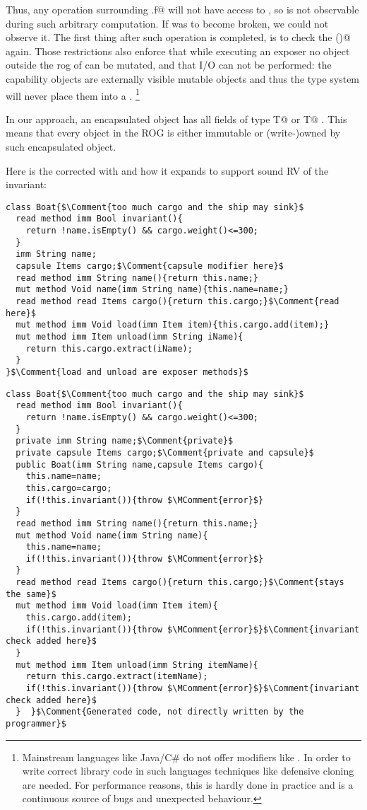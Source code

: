 Thus, any operation surrounding \Q@this.f@ will not have access to \Q@this@, so \Q@this@ is not observable
during such arbitrary computation.
If \Q@this@ was to become broken, we could not  observe it.
The first thing after such operation is completed, is to check the \Q@invariant()@ again.
Those restrictions also enforce that while executing an exposer no object outside the rog of \Q@this@ can be mutated,
and that I/O can not be performed: the capability objects are externally visible mutable objects and thus the type system will
never place them into a \Q@capsule@.%
\footnote{
Mainstream languages like Java/C\# do not offer modifiers like \Q@capsule@.
In order to write correct library code in such languages techniques like
defensive cloning~\cite{Bloch08} are needed.
For performance reasons, this is hardly done in practice and is a continuous source of bugs and unexpected behaviour.
}

In our approach, an encapsulated object has all fields of type \Q@imm T@ or \Q@capsule T@ .
This means that every object in the ROG is either immutable or (write-)owned
by such encapsulated object.

\noindent Here is the corrected \Q@Boat@ with \Q@cargo@ and how it expands to support sound RV of the invariant:


\begin{lstlisting}
class Boat{$\Comment{too much cargo and the ship may sink}$
  read method imm Bool invariant(){
    return !name.isEmpty() && cargo.weight()<=300;
  }
  imm String name;
  capsule Items cargo;$\Comment{capsule modifier here}$
  read method imm String name(){return this.name;}
  mut method Void name(imm String name){this.name=name;}
  read method read Items cargo(){return this.cargo;}$\Comment{read here}$
  mut method imm Void load(imm Item item){this.cargo.add(item);} 
  mut method imm Item unload(imm String iName){
    return this.cargo.extract(iName);
  }
}$\Comment{load and unload are exposer methods}$
\end{lstlisting}
\begin{lstlisting}
class Boat{$\Comment{too much cargo and the ship may sink}$
  read method imm Bool invariant(){
    return !name.isEmpty() && cargo.weight()<=300;
  }
  private imm String name;$\Comment{private}$
  private capsule Items cargo;$\Comment{private and capsule}$
  public Boat(imm String name,capsule Items cargo){
    this.name=name;
    this.cargo=cargo;
    if(!this.invariant()){throw $\MComment{error}$}
  }
  read method imm String name(){return this.name;}
  mut method Void name(imm String name){
    this.name=name;
    if(!this.invariant()){throw $\MComment{error}$}
  }
  read method read Items cargo(){return this.cargo;}$\Comment{stays the same}$
  mut method imm Void load(imm Item item){
    this.cargo.add(item);
    if(!this.invariant()){throw $\MComment{error}$}$\Comment{invariant check added here}$
  } 
  mut method imm Item unload(imm String itemName){
    return this.cargo.extract(itemName);
    if(!this.invariant()){throw $\MComment{error}$}$\Comment{invariant check added here}$
  }  }$\Comment{Generated code, not directly written by the programmer}$
\end{lstlisting}